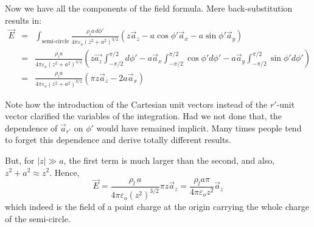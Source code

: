 \documentclass[../../header.tex]{subfiles}
\begin{document}
{Now we have all the components of the field formula. Mere back-substitution results in:
\begin{eqnarray*}
\vec{E} &=& \int_\text{semi-circle} \frac{\rho_l a\,d\phi'}{4\pi \varepsilon_o (z^2 + a^2)^{3/2}} 
(z \vec{a}_z - a \cos \phi' \vec{a}_x - a \sin \phi' \vec{a}_y )\\
&=& \frac{\rho_l a}{4\pi \varepsilon_o (z^2 + a^2)^{3/2} }\left(
z\vec{a_z} \int_{-\pi/2}^{\pi/2} d\phi' - a\vec{a}_x \int_{-\pi/2}^{\pi/2}\cos\phi' d\phi' - a \vec{a}_y \int_{-\pi/2}^{\pi/2} \sin \phi' d\phi'
\right)\\
&=& \frac{\rho_l a}{4\pi \varepsilon_o (z^2 + a^2)^{3/2} } \left( \pi z \vec{a}_z - 2a \vec{a}_x \right)
\end{eqnarray*}

Note how the introduction of the Cartesian unit vectors instead of the $r'$-unit vector clarified the variables of the integration. Had we not done that, the dependence of $\vec{a}_{r'}$ on $\phi'$ would have remained implicit. Many times people tend to forget this dependence and derive totally different results.

But, for $|z| \gg a$, the first term is much larger than the second, and also, $z^2 + a^2 \approx z^2$. Hence,
\begin{equation*}
\vec{E} = \frac{\rho_l\,a}{4\pi \varepsilon_o (z^2)^{3/2} } \pi z \vec{a}_z = \frac{\rho_l a \pi}{4\pi \varepsilon_o z^2} \vec{a}_z
\end{equation*}
which indeed is the field of a point charge at the origin carrying the whole charge of the semi-circle.}
\end{document}
